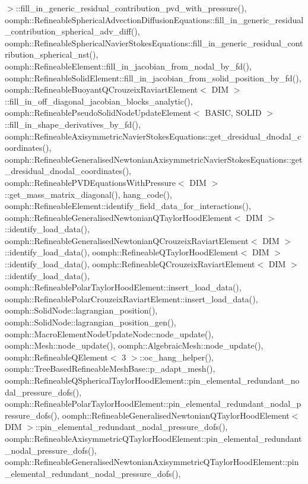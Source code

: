 $>$\+::fill\+\_\+in\+\_\+generic\+\_\+residual\+\_\+contribution\+\_\+pvd\+\_\+with\+\_\+pressure(), oomph\+::\+Refineable\+Spherical\+Advection\+Diffusion\+Equations\+::fill\+\_\+in\+\_\+generic\+\_\+residual\+\_\+contribution\+\_\+spherical\+\_\+adv\+\_\+diff(), oomph\+::\+Refineable\+Spherical\+Navier\+Stokes\+Equations\+::fill\+\_\+in\+\_\+generic\+\_\+residual\+\_\+contribution\+\_\+spherical\+\_\+nst(), oomph\+::\+Refineable\+Element\+::fill\+\_\+in\+\_\+jacobian\+\_\+from\+\_\+nodal\+\_\+by\+\_\+fd(), oomph\+::\+Refineable\+Solid\+Element\+::fill\+\_\+in\+\_\+jacobian\+\_\+from\+\_\+solid\+\_\+position\+\_\+by\+\_\+fd(), oomph\+::\+Refineable\+Buoyant\+Q\+Crouzeix\+Raviart\+Element$<$ D\+I\+M $>$\+::fill\+\_\+in\+\_\+off\+\_\+diagonal\+\_\+jacobian\+\_\+blocks\+\_\+analytic(), oomph\+::\+Refineable\+Pseudo\+Solid\+Node\+Update\+Element$<$ B\+A\+S\+I\+C, S\+O\+L\+I\+D $>$\+::fill\+\_\+in\+\_\+shape\+\_\+derivatives\+\_\+by\+\_\+fd(), oomph\+::\+Refineable\+Axisymmetric\+Navier\+Stokes\+Equations\+::get\+\_\+dresidual\+\_\+dnodal\+\_\+coordinates(), oomph\+::\+Refineable\+Generalised\+Newtonian\+Axisymmetric\+Navier\+Stokes\+Equations\+::get\+\_\+dresidual\+\_\+dnodal\+\_\+coordinates(), oomph\+::\+Refineable\+P\+V\+D\+Equations\+With\+Pressure$<$ D\+I\+M $>$\+::get\+\_\+mass\+\_\+matrix\+\_\+diagonal(), hang\+\_\+code(), oomph\+::\+Refineable\+Element\+::identify\+\_\+field\+\_\+data\+\_\+for\+\_\+interactions(), oomph\+::\+Refineable\+Generalised\+Newtonian\+Q\+Taylor\+Hood\+Element$<$ D\+I\+M $>$\+::identify\+\_\+load\+\_\+data(), oomph\+::\+Refineable\+Generalised\+Newtonian\+Q\+Crouzeix\+Raviart\+Element$<$ D\+I\+M $>$\+::identify\+\_\+load\+\_\+data(), oomph\+::\+Refineable\+Q\+Taylor\+Hood\+Element$<$ D\+I\+M $>$\+::identify\+\_\+load\+\_\+data(), oomph\+::\+Refineable\+Q\+Crouzeix\+Raviart\+Element$<$ D\+I\+M $>$\+::identify\+\_\+load\+\_\+data(), oomph\+::\+Refineable\+Polar\+Taylor\+Hood\+Element\+::insert\+\_\+load\+\_\+data(), oomph\+::\+Refineable\+Polar\+Crouzeix\+Raviart\+Element\+::insert\+\_\+load\+\_\+data(), oomph\+::\+Solid\+Node\+::lagrangian\+\_\+position(), oomph\+::\+Solid\+Node\+::lagrangian\+\_\+position\+\_\+gen(), oomph\+::\+Macro\+Element\+Node\+Update\+Node\+::node\+\_\+update(), oomph\+::\+Mesh\+::node\+\_\+update(), oomph\+::\+Algebraic\+Mesh\+::node\+\_\+update(), oomph\+::\+Refineable\+Q\+Element$<$ 3 $>$\+::oc\+\_\+hang\+\_\+helper(), oomph\+::\+Tree\+Based\+Refineable\+Mesh\+Base\+::p\+\_\+adapt\+\_\+mesh(), oomph\+::\+Refineable\+Q\+Spherical\+Taylor\+Hood\+Element\+::pin\+\_\+elemental\+\_\+redundant\+\_\+nodal\+\_\+pressure\+\_\+dofs(), oomph\+::\+Refineable\+Polar\+Taylor\+Hood\+Element\+::pin\+\_\+elemental\+\_\+redundant\+\_\+nodal\+\_\+pressure\+\_\+dofs(), oomph\+::\+Refineable\+Generalised\+Newtonian\+Q\+Taylor\+Hood\+Element$<$ D\+I\+M $>$\+::pin\+\_\+elemental\+\_\+redundant\+\_\+nodal\+\_\+pressure\+\_\+dofs(), oomph\+::\+Refineable\+Axisymmetric\+Q\+Taylor\+Hood\+Element\+::pin\+\_\+elemental\+\_\+redundant\+\_\+nodal\+\_\+pressure\+\_\+dofs(), oomph\+::\+Refineable\+Generalised\+Newtonian\+Axisymmetric\+Q\+Taylor\+Hood\+Element\+::pin\+\_\+elemental\+\_\+redundant\+\_\+nodal\+\_\+pressure\+\_\+dofs(), 